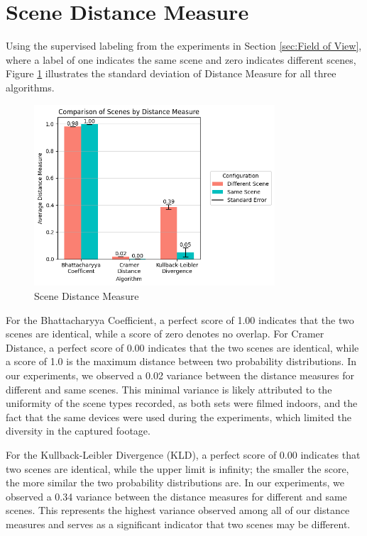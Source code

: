 \section{Scene Distance Measure}
Using the supervised labeling from the experiments in Section \ref{sec:Field of View}, where a label of one indicates the same scene and zero indicates different scenes, Figure \ref{fig:scene-distance-measure} illustrates the standard deviation of Distance Measure for all three algorithms. 

\begin{figure}[ht]
    \centering
    \includegraphics[width=0.8\textwidth]{5 Results/Figures/5.4 Bar Chart.png}
    \caption{Scene Distance Measure}
    \label{fig:scene-distance-measure}
\end{figure}

For the Bhattacharyya Coefficient, a perfect score of 1.00 indicates that the two scenes are identical, while a score of zero denotes no overlap. For Cramer Distance, a perfect score of 0.00 indicates that the two scenes are identical, while a score of 1.0 is the maximum distance between two probability distributions. In our experiments, we observed a 0.02 variance between the distance measures for different and same scenes. This minimal variance is likely attributed to the uniformity of the scene types recorded, as both sets were filmed indoors, and the fact that the same devices were used during the experiments, which limited the diversity in the captured footage.

For the Kullback-Leibler Divergence (KLD), a perfect score of 0.00 indicates that two scenes are identical, while the upper limit is infinity; the smaller the score, the more similar the two probability distributions are. In our experiments, we observed a 0.34 variance between the distance measures for different and same scenes. This represents the highest variance observed among all of our distance measures and serves as a significant indicator that two scenes may be different.

